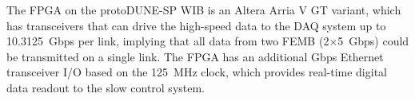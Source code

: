 The FPGA on the protoDUNE-SP WIB is an Altera Arria V GT variant, which has
transceivers that can drive the high-speed data to the DAQ system up to
10.3125~Gbps per link, implying that all data from
two FEMB (2$\times$5~Gbps) could be transmitted on a single link.
The FPGA has an additional Gbps Ethernet transceiver I/O based on the 125~MHz clock, which 
provides real-time digital data readout to the slow control system.
